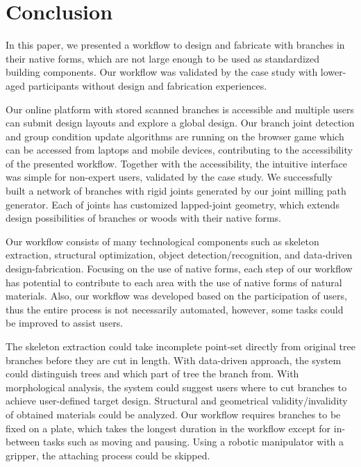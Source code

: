 \section{Conclusion}
In this paper, we presented a workflow to design and fabricate with branches in their native forms, which are not large enough to be used as standardized building components.
Our workflow was validated by the case study with lower-aged participants without design and fabrication experiences.

Our online platform with stored scanned branches is accessible and multiple users can submit design layouts and explore a global design. %
Our branch joint detection and group condition update algorithms are running on the browser game which can be accessed from laptops and mobile devices, contributing to the accessibility of the presented workflow.
Together with the accessibility, the intuitive interface was simple for non-expert users, validated by the case study.
We successfully built a network of branches with rigid joints generated by our joint milling path generator.
Each of joints has customized lapped-joint geometry, which extends design possibilities of branches or woods with their native forms.

Our workflow consists of many technological components such as skeleton extraction, structural optimization, object detection/recognition, and data-driven design-fabrication.
Focusing on the use of native forms, each step of our workflow has potential to contribute to each area with the use of native forms of natural materials.
Also, our workflow was developed based on the participation of users, thus the entire process is not necessarily automated, however, some tasks could be improved to assist users.

The skeleton extraction could take incomplete point-set directly from original tree branches before they are cut in length.
With data-driven approach, the system could distinguish trees and which part of tree the branch from.
With morphological analysis, the system could suggest users where to cut branches to achieve user-defined target design.
Structural and geometrical validity/invalidity of obtained materials could be analyzed.
Our workflow requires branches to be fixed on a plate, which takes the longest duration in the workflow except for in-between tasks such as moving and pausing.
Using a robotic manipulator with a gripper, the attaching process could be skipped.

